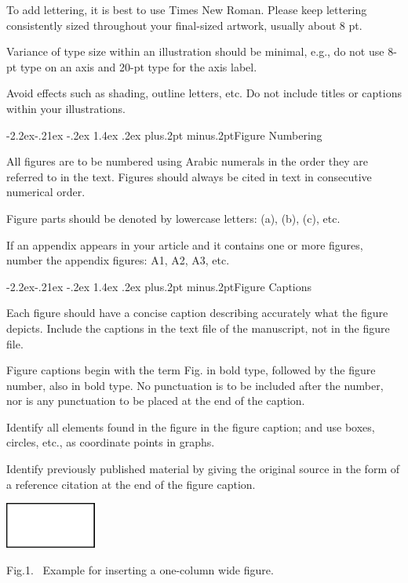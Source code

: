 \documentclass[twoside]{article}
\makeatletter
\def\subsubsection{\@startsection{subsubsection}{3}{\z@}%
 {-2.2ex\@plus -.21ex \@minus -.2ex}%
 {1.4ex \@plus.2ex}
{\normalfont\normalsize\protect\baselineskip=12pt plus.2pt minus.2pt\sl}}
\makeatother
\begin{document}
\begin{multicols}{2}
To add lettering, it is best to use Times New Roman. Please keep lettering consistently sized throughout your final-sized artwork, usually about 8 pt.

Variance of type size within an illustration should be minimal, e.g., do not use 8-pt type on an axis and 20-pt type for the axis label.

Avoid effects such as shading, outline letters, etc. Do not include titles or captions within your illustrations.

\subsubsection{Figure Numbering}

All figures are to be numbered using Arabic numerals in the order they are referred to in the text. Figures should always be cited in text in consecutive numerical order.

Figure parts should be denoted by lowercase letters: (a), (b), (c), etc.

If an appendix appears in your article and it contains one or more figures, number the appendix figures: A1, A2, A3, etc.

\subsubsection{Figure Captions}

Each figure should have a concise caption describing accurately what the figure depicts. Include the captions in the text file of the manuscript, not in the figure file.

Figure captions begin with the term Fig. in bold type, followed by the figure number, also in bold type. No punctuation is to be included after the number, nor is any punctuation to be placed at the end of the caption.

Identify all elements found in the figure in the figure caption; and use boxes, circles, etc., as coordinate points in graphs.

Identify previously published material by giving the original source in the form of a reference citation at the end of the figure caption.

\vspace{4mm}

\begin{center}
\includegraphics[width=3cm]{photo.eps}\\
\vspace{3mm}
\parbox[c]{8.3cm}{\footnotesize{Fig.1.~}  Example for inserting a one-column wide figure. }%
\end{center}


\end{multicols}
\end{document}
